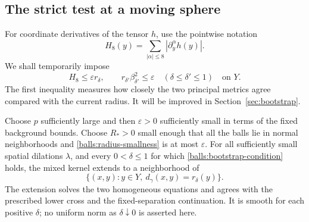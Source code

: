 \subsection{The strict test at a moving sphere}

For coordinate derivatives of the tensor $h$, use the pointwise notation
\[
 H_8(y)=\sum_{|\alpha|\leq8}|\partial_y^\alpha h(y)|.
\]
We shall temporarily impose
\begin{equation}\label{balls:bootstrap-condition}
 H_8\leq\varepsilon r_\delta,\qquad
 r_{\delta'}\beta_{\delta'}^2\leq\varepsilon
       \quad(\delta\leq\delta'\leq1)
 \quad\text{on }Y.
\end{equation}
The first inequality measures how closely the two principal metrics
agree compared with the current radius.  It will be improved in
Section~\ref{sec:bootstrap}.

\begin{proposition}\label{balls:continuation}
Choose $p$ sufficiently large and then $\varepsilon>0$ sufficiently small
in terms of the fixed background bounds.  Choose $R_*>0$ small enough
that all the balls lie in normal neighborhoods and
\eqref{balls:radius-smallness} is at most $\varepsilon$.
For all sufficiently small spatial dilations $\lambda$, and every
$0<\delta\le1$ for which \eqref{balls:bootstrap-condition} holds, the mixed
kernel extends to a neighborhood of
\[
 \{(x,y):y\in Y,\ d_\gamma(x,y)=r_\delta(y)\}.
\]
The extension solves the two homogeneous equations and agrees with the
prescribed lower cross and the fixed-separation continuation.  It is
smooth for each positive $\delta$; no uniform norm as $\delta\downarrow0$
is asserted here.
\end{proposition}

